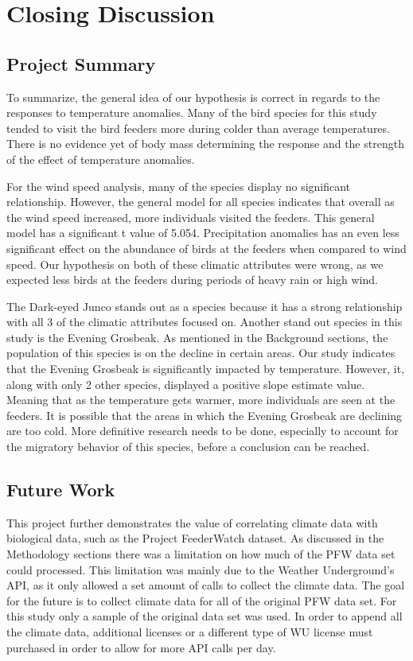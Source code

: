 \chapter{Closing Discussion}

\section{Project Summary}

To summarize, the general idea of our hypothesis is correct in regards to the responses to temperature anomalies. Many of the bird species  for this study tended to visit the bird feeders more during colder than average temperatures. There is no evidence yet of body mass determining the response and the strength of the effect of temperature anomalies. 

For the wind speed analysis, many of the species display no significant relationship. However, the general model for all species indicates that overall as the wind speed increased, more individuals visited the feeders. This general model has a significant t value of 5.054. Precipitation anomalies has an even less significant effect on the abundance of birds at the feeders when compared to wind speed. Our hypothesis on both of these climatic attributes were wrong, as we expected less birds at the feeders during periods of heavy rain or high wind. 

The Dark-eyed Junco stands out as a species because it has a strong relationship with all 3 of the climatic attributes focused on. Another stand out species in this study is the Evening Grosbeak. As mentioned in the Background sections, the population of this species is on the decline in certain areas. Our study indicates that the Evening Grosbeak is significantly impacted by temperature. However, it, along with only 2 other species, displayed a positive slope estimate value. Meaning that as the temperature gets warmer, more individuals are seen at the feeders. It is possible that the areas in which the Evening Grosbeak are declining are too cold. More definitive research needs to be done, especially to account for the migratory behavior of this species, before a conclusion can be reached.       

\section{Future Work}

This project further demonstrates the value of correlating climate data with biological data, such as the Project FeederWatch dataset. As discussed in the Methodology sections there was a limitation on how much of the PFW data set could processed. This limitation was mainly due to the Weather Underground's API, as it only allowed a set amount of calls to collect the climate data. The goal for the future is to collect climate data for all of the original PFW data set. For this study only a sample of the original data set was used. In order to append all the climate data, additional licenses or a different type of WU license must purchased in order to allow for more API calls per day.

